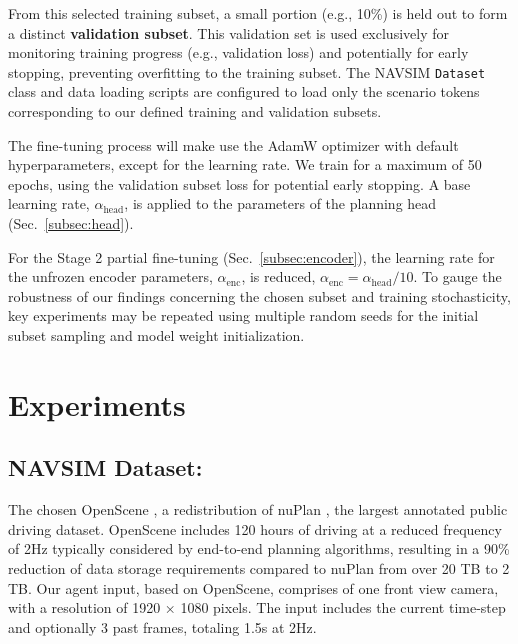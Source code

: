 \documentclass{article}
\begin{document}
From this selected training subset, a small portion (e.g., 10\%) is held out to form a distinct \textbf{validation subset}. This validation set is used exclusively for monitoring training progress (e.g., validation loss) and potentially for early stopping, preventing overfitting to the training subset. The NAVSIM \texttt{Dataset} class and data loading scripts are configured to load only the scenario tokens corresponding to our defined training and validation subsets.

The fine-tuning process will make use the AdamW optimizer \cite{loshchilov2017decoupled} with default hyperparameters, except for the learning rate. We train for a maximum of 50 epochs, using the validation subset loss for potential early stopping. A base learning rate, $\alpha_{\text{head}}$, is applied to the parameters of the planning head (Sec.~\ref{subsec:head}). 

For the Stage 2 partial fine-tuning (Sec.~\ref{subsec:encoder}), the learning rate for the unfrozen encoder parameters, $\alpha_{\text{enc}}$, is reduced, $\alpha_{\text{enc}} = \alpha_{\text{head}} / 10$. To gauge the robustness of our findings concerning the chosen subset and training stochasticity, key experiments may be repeated using multiple random seeds for the initial subset sampling and model weight initialization.


\section{Experiments}
\subsection{NAVSIM Dataset:}
The  chosen OpenScene \cite{Open2023op}, a redistribution of nuPlan \cite{Nap2024to}, the largest annotated public driving dataset. OpenScene
includes 120 hours of driving at a reduced frequency of 2Hz typically considered by end-to-end
planning algorithms, resulting in a 90\% reduction of data storage requirements compared to nuPlan
from over 20 TB to 2 TB. Our agent input, based on OpenScene, comprises of one front view camera, with a resolution of 1920 × 1080 pixels. The input
includes the current time-step and optionally 3 past frames, totaling 1.5s at 2Hz.\cite{dauner2024navsim}
\end{document}
